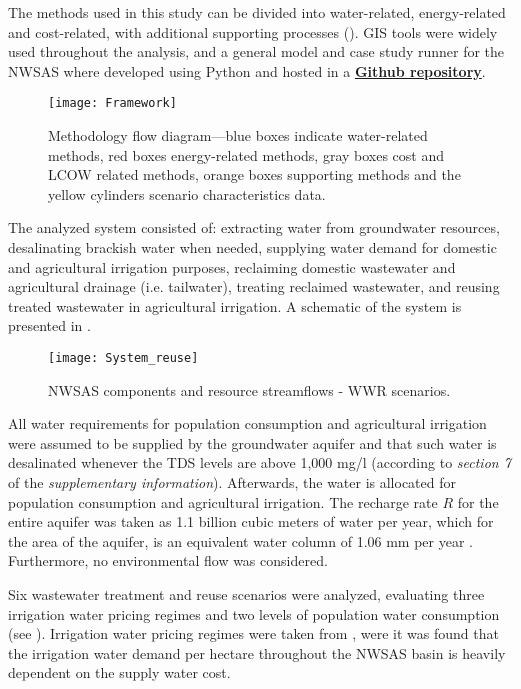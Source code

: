 The methods used in this study can be divided into water-related, energy-related and cost-related, with additional supporting processes (). GIS tools were widely used throughout the analysis, and a general model and case study runner for the NWSAS where developed using Python and hosted in a \href{https://github.com/camiloramirezgo/NWSAS-paper-model}{\textbf{Github repository}}.

\begin{figure*}[!h]
	\centering
	\texttt{[image: Framework]}
	\caption{Methodology flow diagram---blue boxes indicate water-related methods, red boxes energy-related methods, gray boxes cost and LCOW related methods, orange boxes supporting methods and the yellow cylinders scenario characteristics data.}
	\label{fig:framework}
\end{figure*}

The analyzed system consisted of: extracting water from groundwater resources, desalinating brackish water when needed, supplying water demand for domestic and agricultural irrigation purposes, reclaiming domestic wastewater and agricultural drainage (i.e. tailwater), treating reclaimed wastewater, and reusing treated wastewater in agricultural irrigation. A schematic of the system is presented in .

\begin{figure*}[!ht]
	\centering
	\texttt{[image: System\_reuse]}
	\caption{NWSAS components and resource streamflows - WWR scenarios.}
	\label{fig:systemreuse}
\end{figure*}

All water requirements for population consumption and agricultural irrigation were assumed to be supplied by the groundwater aquifer and that such water is desalinated whenever the TDS levels are above 1,000 mg/l \cite{fao1985water} (according to \textit{section 7} of the \textit{supplementary information}). Afterwards, the water is allocated for population consumption and agricultural irrigation. The recharge rate $R$ for the entire aquifer was taken as 1.1 billion cubic meters of water per year, which for the area of the aquifer, is an equivalent water column of 1.06 mm per year \cite{BetterValorizationIrrigation2015}. Furthermore, no environmental flow was considered.

Six wastewater treatment and reuse scenarios were analyzed, evaluating three irrigation water pricing regimes and two levels of population water consumption (see ). Irrigation water pricing regimes were taken from \cite{Socioeconomicaspectsirrigation2014}, were it was found that the irrigation water demand per hectare throughout the NWSAS basin is heavily dependent on the supply water cost. 

